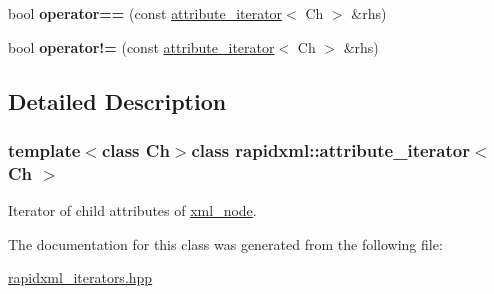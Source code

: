 \begin{DoxyCompactItemize}
\item 
\hypertarget{classrapidxml_1_1attribute__iterator_ab1dc8dd11d21e145a4e3f76d46aead0d}{bool {\bfseries operator==} (const \hyperlink{classrapidxml_1_1attribute__iterator}{attribute\+\_\+iterator}$<$ Ch $>$ \&rhs)}\label{classrapidxml_1_1attribute__iterator_ab1dc8dd11d21e145a4e3f76d46aead0d}

\item 
\hypertarget{classrapidxml_1_1attribute__iterator_a39e8cf336c324521fd9c720abf280d88}{bool {\bfseries operator!=} (const \hyperlink{classrapidxml_1_1attribute__iterator}{attribute\+\_\+iterator}$<$ Ch $>$ \&rhs)}\label{classrapidxml_1_1attribute__iterator_a39e8cf336c324521fd9c720abf280d88}

\end{DoxyCompactItemize}


\subsection{Detailed Description}
\subsubsection*{template$<$class Ch$>$class rapidxml\+::attribute\+\_\+iterator$<$ Ch $>$}

Iterator of child attributes of \hyperlink{singletonrapidxml_1_1xml__node}{xml\+\_\+node}. 

The documentation for this class was generated from the following file\+:\begin{DoxyCompactItemize}
\item 
\hyperlink{rapidxml__iterators_8hpp}{rapidxml\+\_\+iterators.\+hpp}\end{DoxyCompactItemize}
